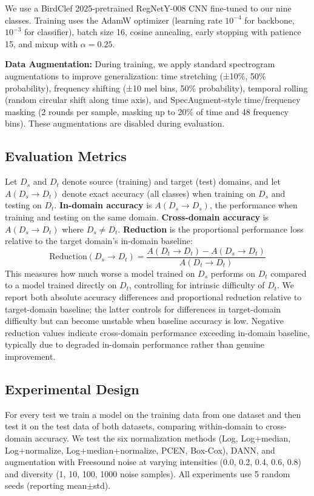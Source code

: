 \documentclass[peer-review]{fa2026}
\begin{document}
We use a BirdClef 2025-pretrained RegNetY-008 CNN \cite{shionao7_regnrty008_2024} fine-tuned to our nine classes. Training uses the AdamW optimizer (learning rate $10^{-4}$ for backbone, $10^{-3}$ for classifier), batch size 16, cosine annealing, early stopping with patience 15, and mixup with $\alpha=0.25$.

\textbf{Data Augmentation:} During training, we apply standard spectrogram augmentations to improve generalization: time stretching (±10\%, 50\% probability), frequency shifting (±10 mel bins, 50\% probability), temporal rolling (random circular shift along time axis), and SpecAugment-style time/frequency masking (2 rounds per sample, masking up to 20\% of time and 48 frequency bins). These augmentations are disabled during evaluation.

\subsection{Evaluation Metrics}

Let $D_s$ and $D_t$ denote source (training) and target (test) domains, and let $A(D_s \to D_t)$ denote exact accuracy (all classes) when training on $D_s$ and testing on $D_t$. \textbf{In-domain accuracy} is $A(D_s \to D_s)$, the performance when training and testing on the same domain. \textbf{Cross-domain accuracy} is $A(D_s \to D_t)$ where $D_s \neq D_t$. \textbf{Reduction} is the proportional performance loss relative to the target domain's in-domain baseline:
\begin{equation}
\text{Reduction}(D_s \to D_t) = \frac{A(D_t \to D_t) - A(D_s \to D_t)}{A(D_t \to D_t)}
\end{equation}
This measures how much worse a model trained on $D_s$ performs on $D_t$ compared to a model trained directly on $D_t$, controlling for intrinsic difficulty of $D_t$. We report both absolute accuracy differences and proportional reduction relative to target-domain baseline; the latter controls for differences in target-domain difficulty but can become unstable when baseline accuracy is low. Negative reduction values indicate cross-domain performance exceeding in-domain baseline, typically due to degraded in-domain performance rather than genuine improvement.

\subsection{Experimental Design}

For every test we train a model on the training data from one dataset and then test it on the test data of both datasets, comparing within-domain to cross-domain accuracy. We test the six normalization methods (Log, Log+median, Log+normalize, Log+median+normalize, PCEN, Box-Cox), DANN, and augmentation with Freesound noise at varying intensities (0.0, 0.2, 0.4, 0.6, 0.8) and diversity (1, 10, 100, 1000 noise samples). All experiments use 5 random seeds (reporting mean$\pm$std).
\end{document}
